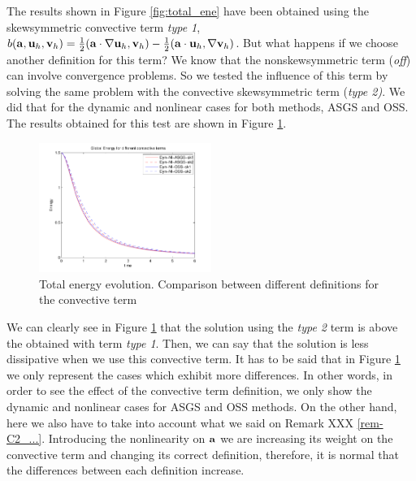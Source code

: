 \begin{remark}
\label{rem-C4_ene_skew2}
The results shown in Figure \ref{fig:total_ene} have been obtained using the skewsymmetric convective term \textit{type 1}, $b({\bf a},{\bf u}_h,{\bf v}_h)=\frac{1}{2}({\bf a}\cdot\nabla{\bf u}_h,{\bf v}_h)-\frac{1}{2}(\mathbf{a}\cdot{\bf u}_h,\nabla{\bf v}_h)$. But what happens if we choose another definition for this term? We know that the nonskewsymmetric term (\textit{off}) can involve convergence problems. So we tested the influence of this term by solving the same problem with the convective skewsymmetric term (\textit{type 2)}. We did that for the dynamic and nonlinear cases for both methods, ASGS and OSS. The results obtained for this test are shown in Figure \ref{fig:ene_skew}.
\begin{figure}[h!]
	\centering	
	\includegraphics[width=0.5\textwidth]{Figures/Chapter4/DHIT/ene_skew_scaled}
	\caption{Total energy evolution. Comparison between different definitions for the convective term}
	\label{fig:ene_skew}
\end{figure}

We can clearly see in Figure \ref{fig:ene_skew} that the solution using the \textit{type 2} term is above the obtained with term \textit{type 1}. Then, we can say that the solution is less dissipative when we use this convective term. It has to be said that in Figure \ref{fig:ene_skew} we only represent the cases which exhibit more differences. In other words, in order to see the effect of the convective term definition, we only show the dynamic and nonlinear cases for ASGS and OSS methods. On the other hand, here we also have to take into account what we said on Remark XXX \ref{rem-C2_...}. Introducing the nonlinearity on ${\bf a}$ we are increasing its weight on the convective term and changing its correct definition, therefore, it is normal that the differences between each definition increase.
\end{remark}

